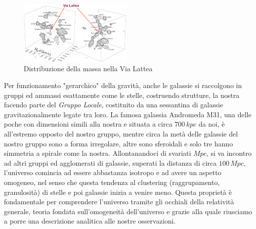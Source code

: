 \documentclass[a4paper,twoside,openany,notitlepage]{book}
\theoremstyle{definition}
\theoremstyle{plain}
\begin{document}
\begin{figure}
	\vspace{-10pt}
	\centering
	\includegraphics[width=0.49\textwidth]{./Immagini/Capitolo1/Gruppo_locale.PNG}
	\caption*{Distribuzione della massa nella Via Lattea}
	\vspace{-10pt}
\end{figure}


Per funzionamento "gerarchico" della gravità, anche le galassie si raccolgono in gruppi ed ammassi esattamente come le stelle, costruendo strutture, la nostra facendo parte del \textit{Gruppo Locale}, costituito da una sessantina di galassie gravitazionalmente legate tra loro. La famosa galassia Andromeda M31, una delle poche con dimensioni simili alla nostra e situata a circa $700\,kpc$ da noi, è all'estremo opposto del nostro gruppo, mentre circa la metà delle galassie del nostro gruppo sono a forma irregolare, altre sono sferoidali e solo tre hanno simmetria a spirale come la nostra. Allontanandoci di svariati $Mpc$, si va incontro ad altri gruppi ed agglomerati di galassie, superati la distanza di circa $100\,Mpc$, l'universo comincia ad essere abbastanza isotropo e ad avere un aspetto omogeneo, nel senso che questa tendenza al clustering (raggrupamento, granulosità) di stelle e poi galassie inizia a venire meno. Questa proprietà è fondamentale per comprendere l'universo tramite gli occhiali della relatività generale, teoria fondata sull'omogeneità dell'universo e grazie alla quale riusciamo a porre una descrizione analitica alle nostre osservazioni. 
\end{document}
